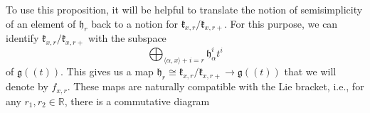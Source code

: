 \documentclass[12pt]{article}
\theoremstyle{remark}
\begin{document}
To use this proposition, it will be helpful to translate the notion of semisimplicity of an element of $\mathfrak{h}_r$ back to a notion for $\mathfrak{k}_{x,r}/\mathfrak{k}_{x,r+}.$ For this purpose, we can identify $\mathfrak{k}_{x,r}/\mathfrak{k}_{x,r+}$ with the subspace
\[
\displaystyle\bigoplus_{\langle\alpha,x\rangle+i=r}\mathfrak{h}_{\alpha}^it^i
\]
of $\mathfrak{g}((t)).$ This gives us a map $\mathfrak{h}_r\cong\mathfrak{k}_{x,r}/\mathfrak{k}_{x,r+}\rightarrow\mathfrak{g}((t))$ that we will denote by $f_{x,r}.$ These maps are naturally compatible with the Lie bracket, i.e., for any $r_1, r_2\in\mathbb{R}$, there is a commutative diagram

\begin{center}
\end{center}
\end{document}
